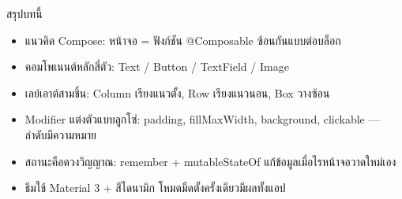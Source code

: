 \begin{tcbsummary}{สรุปบทนี้}
\begin{itemize}
  \item แนวคิด Compose: หน้าจอ = ฟังก์ชัน @Composable ซ้อนกันแบบต่อบล็อก
  \item คอมโพเนนต์หลักสี่ตัว: Text / Button / TextField / Image
  \item เลย์เอาต์สามชิ้น: Column เรียงแนวตั้ง, Row เรียงแนวนอน, Box วางซ้อน
  \item Modifier แต่งตัวแบบลูกโซ่: padding, fillMaxWidth, background, clickable — ลำดับมีความหมาย
  \item สถานะคือดวงวิญญาณ: remember + mutableStateOf แก้ข้อมูลเมื่อไรหน้าจอวาดใหม่เอง
  \item ธีมใช้ Material 3 + สีไดนามิก โหมดมืดตั้งครั้งเดียวมีผลทั้งแอป
\end{itemize}

\end{tcbsummary}
